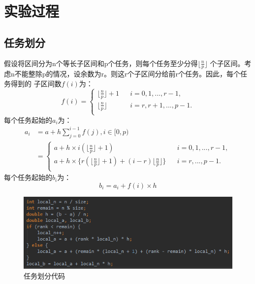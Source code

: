 \documentclass[12pt]{article}
\begin{document}
\section{实验过程}
\subsection{任务划分}
假设将区间分为n个等长子区间和p个任务，则每个任务至少分得$\lfloor \frac{n}{p} \rfloor$
个子区间。考虑n不能整除p的情况，设余数为r。则这r个子区间分给前r个任务。因此，每个任务得到的
子区间数$f(i)$为：
\begin{equation}
f(i)=\left\{
\begin{array}{lll}
\lfloor \frac{n}{p} \rfloor + 1 & & {i = 0, 1, ..., r-1},\\
\lfloor \frac{n}{p} \rfloor & & {i = r, r+1, ..., p-1}.\\
\end{array} \right.
\end{equation}
每个任务起始的$a_i$为：
\begin{equation}
  \begin{aligned}
    a_i &= a+h\sum\limits_{j=0}^{i-1}f(j), i\in [0, p)\\
    &= \left\{
    \begin{array}{lll}
    a+h \times i(\lfloor \frac{n}{p} \rfloor + 1) & & {i = 0, 1, ..., r-1},\\
    a+h \times \{r(\lfloor \frac{n}{p} \rfloor + 1) + (i-r)\lfloor \frac{n}{p} \rfloor\} & & {i = r, ..., p-1}.\\
    \end{array} \right.
  \end{aligned}
\end{equation}
每个任务起始的$b_i$为：
\begin{equation}
  b_i = a_i + f(i) \times h
\end{equation}
\begin{figure}[h]
\begin{center}
\includegraphics[width=\textwidth]{p4.png} %
\caption{任务划分代码}
\end{center}
\end{figure}
\end{document}
